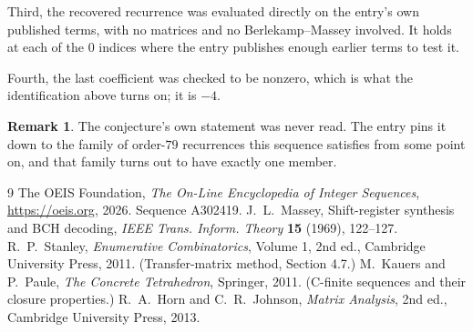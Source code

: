 \documentclass[11pt,a4paper]{article}
\theoremstyle{plain}
\theoremstyle{definition}
\newtheorem{remark}[theorem]{Remark}
\begin{document}
Third, the recovered recurrence was evaluated directly on the entry's own published terms, with
no matrices and no Berlekamp--Massey involved. It holds at each of the $0$ indices where
the entry publishes enough earlier terms to test it.

Fourth, the last coefficient was checked to be nonzero, which is what the identification above
turns on; it is $-4$.

\begin{remark}
The conjecture's own statement was never read. The entry pins it down to the family of
order-$79$ recurrences this sequence satisfies from some point on, and that family turns
out to have exactly one member.
\end{remark}

\begin{thebibliography}{9}
 The OEIS Foundation, \emph{The On-Line Encyclopedia of Integer
Sequences}, \url{https://oeis.org}, 2026. Sequence A302419.
 J.~L.~Massey, Shift-register synthesis and BCH decoding, \emph{IEEE
Trans. Inform. Theory} \textbf{15} (1969), 122--127.
 R.~P.~Stanley, \emph{Enumerative Combinatorics}, Volume 1, 2nd ed.,
Cambridge University Press, 2011. (Transfer-matrix method, Section 4.7.)
 M.~Kauers and P.~Paule, \emph{The Concrete Tetrahedron}, Springer, 2011.
(C-finite sequences and their closure properties.)
 R.~A.~Horn and C.~R.~Johnson, \emph{Matrix Analysis}, 2nd ed., Cambridge
University Press, 2013.
\end{thebibliography}
\end{document}
